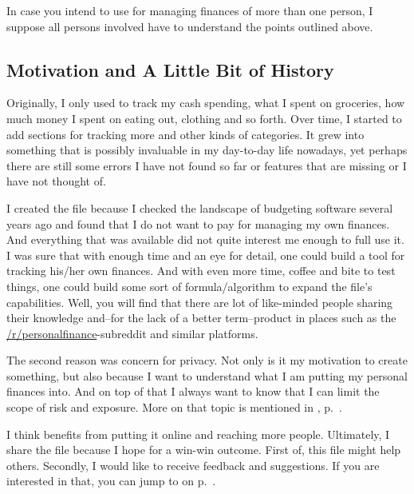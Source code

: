 In case you intend to use \tfn for managing finances of more than one person, I suppose all persons involved have to understand the points outlined above.

\subsection{Motivation and A Little Bit of History}
\label{subsec:motivation-history}

Originally, I only used \tfn to track my cash spending, \ie what I spent on groceries, how much money I spent on eating out, clothing and so forth.
Over time, I started to add sections for tracking more and other kinds of categories.
It grew into something that is possibly invaluable in my day-to-day life nowadays, yet perhaps there are still some errors I have not found so far or features that are missing or I have not thought of.

I created the file because I checked the landscape of budgeting software several years ago and found that I do not want to pay for managing my own finances.
And everything that was available did not quite interest me enough to full use it.
I was sure that with enough time and an eye for detail, one could build a tool for tracking his/her own finances.
And with even more time, coffee and bite to test things, one could build some sort of formula/algorithm to expand the file's capabilities.
Well, you will find that there are lot of like-minded people sharing their knowledge and--for the lack of a better term--product in places such as the \href{https://reddit.com/r/personalfinance}{/r/personalfinance}-subreddit and similar platforms.

The second reason was concern for privacy.
Not only is it my motivation to create something, but also because I want to understand what I am putting my personal finances into.
And on top of that I always want to know that I can limit the scope of risk and exposure.
More on that topic is mentioned in , p.~\pageref{subsubsec:security}.

I think \tfn benefits from putting it online and reaching more people.
Ultimately, I share the file because I hope for a win-win outcome.
First of, this file might help others.
Secondly, I would like to receive feedback and suggestions.
If you  are interested in that, you can jump to  on p.~\pageref{sec:feedback}.

\begin{comment}
\subsection{About This Guide}
\label{subsec:about-this-guide}
Hm\ldots let's wait and see
\end{comment}

